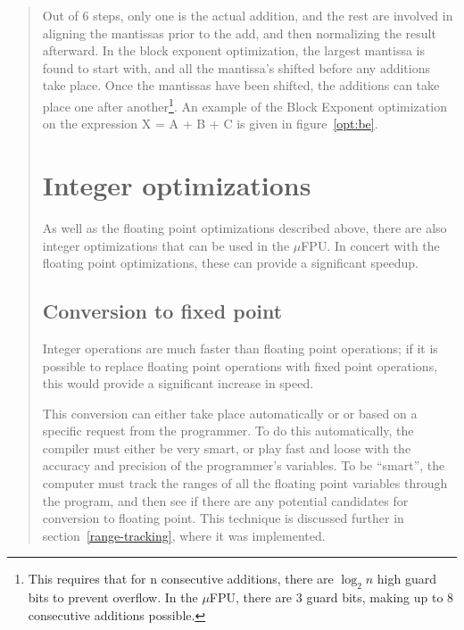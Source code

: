\begin{quote}
Out of 6 steps, only one is the actual addition, and the rest are involved
in aligning the mantissas prior to the add, and then normalizing the result
afterward.  In the block exponent optimization, the largest mantissa is
found to start with, and all the mantissa's shifted before any additions
take place.  Once the mantissas have been shifted, the additions can take
place one after another\footnote{This requires that for n consecutive
additions, there are $\log_{2}n$ high guard bits to prevent overflow.  In
the $\mu$FPU, there are 3 guard bits, making up to 8 consecutive additions
possible.}.  An example of the Block Exponent optimization on the expression
X = A + B + C is given in figure~\ref{opt:be}.

%

\section{Integer optimizations}

As well as the floating point optimizations described above, there are
also integer optimizations that can be used in the $\mu$FPU.  In concert
with the floating point optimizations, these can provide a significant
speedup.  

\subsection{Conversion to fixed point}

Integer operations are much faster than floating point operations; if it is
possible to replace floating point operations with fixed point operations,
this would provide a significant increase in speed.

This conversion can either take place automatically or or based on a
specific request from the programmer.  To do this automatically, the
compiler must either be very smart, or play fast and loose with the accuracy
and precision of the programmer's variables.  To be ``smart'', the computer
must track the ranges of all the floating point variables through the
program, and then see if there are any potential candidates for conversion
to floating point.  This technique is discussed further in
section~\ref{range-tracking}, where it was implemented.


\end{quote}
